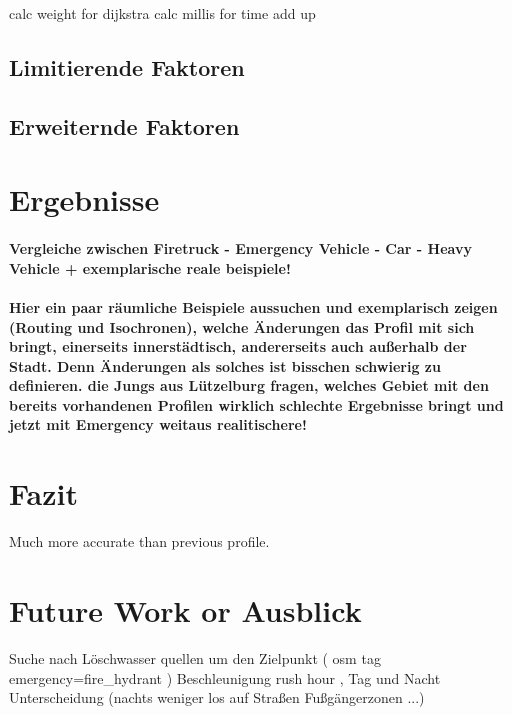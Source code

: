 \documentclass[10pt,a4paper]{article}
\begin{document}
calc weight for dijkstra
calc millis for time add up



\subsection{Limitierende Faktoren}

\subsection{Erweiternde Faktoren}

\section{Ergebnisse}
\paragraph{
Vergleiche zwischen Firetruck - Emergency Vehicle - Car - Heavy Vehicle
+ exemplarische reale beispiele!
}
\paragraph{
\color{red}
Hier ein paar räumliche Beispiele aussuchen und exemplarisch zeigen (Routing und Isochronen), welche Änderungen das Profil mit sich bringt, einerseits innerstädtisch, andererseits auch außerhalb der Stadt. Denn Änderungen als solches ist bisschen schwierig zu definieren. die Jungs aus Lützelburg fragen, welches Gebiet mit den bereits vorhandenen Profilen wirklich schlechte Ergebnisse bringt und jetzt mit Emergency weitaus realitischere!
}

\section{Fazit}

Much more accurate than previous profile. 

\section{Future Work or Ausblick}

Suche nach Löschwasser quellen um den Zielpunkt ( osm tag emergency=fire\_hydrant )
Beschleunigung
rush hour , Tag und Nacht Unterscheidung (nachts weniger los auf Straßen\/ Fußgängerzonen ...)

\printbibliography
\end{document}

